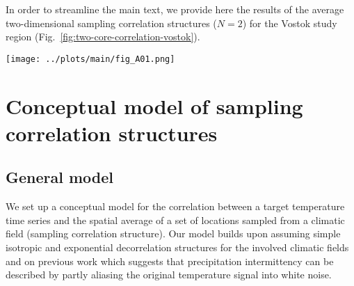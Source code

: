 \documentclass[cp, manuscript]{copernicus}
\begin{document}
In order to streamline the main text, we provide here the results of the
average two-dimensional sampling correlation structures ($N=2$) for the Vostok
study region (Fig.~\ref{fig:two-core-correlation-vostok}).

\begin{figure*}[t]%
\centering
\texttt{[image: ../plots/main/fig\_A01.png]}
\caption{%
  Sampling correlation structures with temperature in the two-dimensional case
  of sampling two locations in the Vostok region. Shown is the mean correlation
  of all possible single correlations from averaging two grid cells of
  (\textbf{a}) $T_{\mathrm{2m}}$, (\textbf{b}) $T_{\mathrm{2m}}^{\mathrm{(pw)}}$
  and (\textbf{c}) $\delta^{18}\mathrm{O}^{\mathrm{(pw)}}$ time series sampled
  from the same or from two different rings, averaged over all target sites in
  the given region. The axes display the distance from the target, where the $x$
  ($y$) axis stands for the first (second) sampled ring and tickmarks
  indicate the radius of the midpoints of the rings. Note that for
  $\delta^{18}\mathrm{O}^{\mathrm{(pw)}}$ the -- albeit marginal -- correlation
  maximum is located for combining the innermost ring with the ring between
  $500$--$750$\,km.}
\label{fig:two-core-correlation-vostok}%
\end{figure*}%

\section{Conceptual model of sampling correlation structures}
\label{app:concept.model}

\subsection{General model}
\label{app:concept.model.general}

We set up a conceptual model for the correlation between a target temperature
time series and the spatial average of a set of locations sampled from a
climatic field (sampling correlation structure). Our model builds upon assuming
simple isotropic and exponential decorrelation structures for the involved
climatic fields and on previous work which suggests that precipitation
intermittency can be described by partly aliasing the original temperature
signal into white noise.
\end{document}
